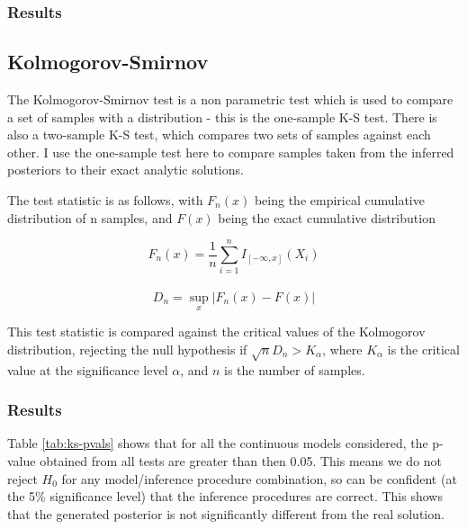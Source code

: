 \subsubsection{Results}
\begin{table}[!ht]
	\centering
	\caption{p-values of $\chi^2$ test on different models using different inference procedures}
	\label{tab:chi-pvals}
\end{table}

\subsection{Kolmogorov-Smirnov}

The Kolmogorov-Smirnov test is a non parametric test which is used to compare a set of samples with a distribution - this is the one-sample K-S test. There is also a two-sample K-S test, which compares two sets of samples against each other. I use the one-sample test here to compare samples taken from the inferred posteriors to their exact analytic solutions.

The test statistic is as follows, with $F_n(x)$ being the empirical cumulative distribution of n samples, and $F(x)$ being the exact cumulative distribution

$$F_{n}(x)=\frac{1}{n}\sum_{i=1}^{n}I_{[-\infty ,x]}(X_{i})$$\\
$$D_{n}=\sup_{x}|F_{n}(x)-F(x)|$$

This test statistic is compared against the critical values of the Kolmogorov distribution, rejecting the null hypothesis if $\sqrt{n}D_n > K_\alpha$, where $K_\alpha$ is the critical value at the significance level $\alpha$, and $n$ is the number of samples.

\subsubsection{Results}

Table \ref{tab:ks-pvals} shows that for all the continuous models considered, the p-value obtained from all tests are greater than then 0.05. This means we do not reject $H_0$ for any model/inference procedure combination, so can be confident (at the 5\% significance level) that the inference procedures are correct. This shows that the generated posterior is not significantly different from the real solution.

